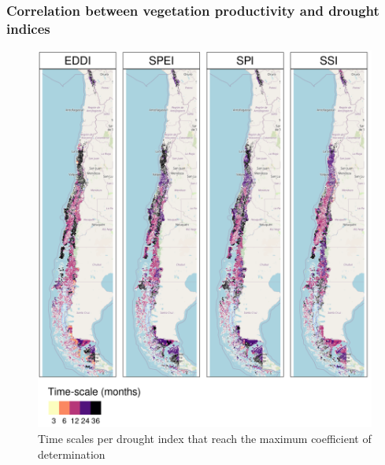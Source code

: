 \documentclass[
  authoryear,
  preprint,
  3p,
  onecolumn]{elsarticle}
\begin{document}
\hypertarget{correlation-between-vegetation-productivity-and-drought-indices}{%
\subsubsection{Correlation between vegetation productivity and drought
indices}\label{correlation-between-vegetation-productivity-and-drought-indices}}

\begin{figure}[!ht]

{\centering \includegraphics{../output/figs/mapa_cor_selec_indices_zcNDVI6.png}

}

\caption{\label{fig-corTimeScale}Time scales per drought index that
reach the maximum coefficient of determination}

\end{figure}
\end{document}
